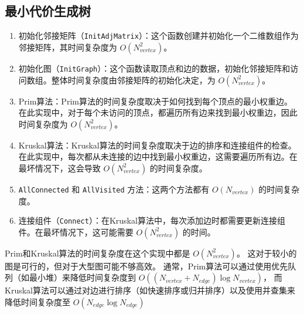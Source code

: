 \documentclass[UTF8]{ctexart}
\begin{document}
\subsection{最小代价生成树}
\begin{enumerate}
  \item 初始化邻接矩阵（\lstinline{InitAdjMatrix}）：这个函数创建并初始化一个二维数组作为邻接矩阵，其时间复杂度为 $O(N_{vertex}^2)$。
  \item 初始化图（\lstinline{InitGraph}）：这个函数读取顶点和边的数据，初始化邻接矩阵和访问数组。整体时间复杂度由邻接矩阵的初始化决定，为 $O(N_{vertex}^2)$。
  \item Prim算法：Prim算法的时间复杂度取决于如何找到每个顶点的最小权重边。在此实现中，对于每个未访问的顶点，都遍历所有边来找到最小权重边，因此时间复杂度为 $O(N_{vertex}^2)$。
  \item Kruskal算法：Kruskal算法的时间复杂度取决于边的排序和连接组件的检查。在此实现中，每次都从未连接的边中找到最小权重边，这需要遍历所有边。在最坏情况下，这会导致 $O(N_{vertex}^2)$ 的时间复杂度。
  \item \lstinline{AllConnected} 和 \lstinline{AllVisited} 方法：这两个方法都有 $O(N_{vertex})$ 的时间复杂度。
  \item 连接组件（\lstinline{Connect}）：在Kruskal算法中，每次添加边时都需要更新连接组件。在最坏情况下，这可能需要 $O(N_{vertex}^2)$ 的时间。
\end{enumerate}

Prim和Kruskal算法的时间复杂度在这个实现中都是 $O(N_{vertex}^2)$。
这对于较小的图是可行的，但对于大型图可能不够高效。
通常，Prim算法可以通过使用优先队列（如最小堆）来降低时间复杂度到 $O((N_{vertex} + N_{edge}) \log N_{vertex})$，
而Kruskal算法可以通过对边进行排序（如快速排序或归并排序）以及使用并查集来降低时间复杂度至 $O(N_{edge} \log N_{edge})$
\end{document}
